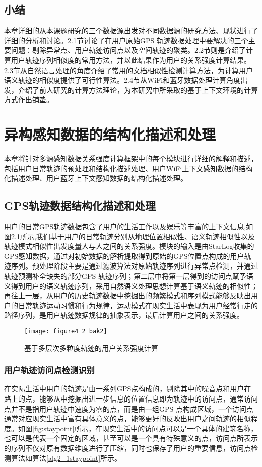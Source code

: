 \section{小结}
\label{sec:section2-4}
本章详细的从本课题研究的三个数据源出发对不同数据源的研究方法、现状进行了详细的分析和讨论。2.1节讨论了在用户原始GPS 轨迹数据处理中要解决的三个主要问题：剔除异常点、用户轨迹访问点以及空间轨迹的聚类。2.2节则是介绍了计算用户轨迹序列相似度的常用方法，并以此结果作为用户的关系强度计算结果。2.3节从自然语言处理的角度介绍了常用的文档相似性检测计算方法，为计算用户语义轨迹的相似度提供了可行性算法。2.4节从WiFi和蓝牙数据处理计算角度出发，介绍了前人研究的计算方法理论，为本研究中所采取的基于上下文环境的计算方式作出铺垫。


\chapter{异构感知数据的结构化描述和处理}
\label{chap:chapter03}
本章将针对多源感知数据关系强度计算框架中的每个模块进行详细的解释和描述，包括用户日常轨迹的预处理和结构化描述处理、用户WiFi上下文感知数据的结构化描述处理、用户蓝牙上下文感知数据的结构化描述处理。
\section{GPS轨迹数据结构化描述和处理}
\label{sec:section3-1}
用户的日常GPS轨迹数据包含了用户的生活工作以及娱乐等丰富的上下文信息,如图\ref{fig:tramodel}所示,我们基于用户的日常轨迹分别从地理位置相似性、语义轨迹相似性以及轨迹模式相似性出发度量人与人之间的关系强度。模块的输入是由StarLog收集的GPS感知数据，通过对初始数据的解析提取得到原始的GPS位置点构成的用户轨迹序列。预处理阶段主要是通过滤波算法对原始轨迹序列进行异常点检测，并通过轨迹预测补全缺失的部分GPS 轨迹序列；第二层中将第一层得到的访问点赋予语义得到用户的语义轨迹序列，采用自然语义处理思想计算基于语义轨迹的相似性；再往上一层，从用户的历史轨迹数据中挖掘出的频繁模式和序列模式能够反映出用户的日常轨迹运动习惯和行为规律，运动模式在现实生活中表现为用户经常行走的路径序列，是用户轨迹数据规律的抽象表示，最后计算用户之间的关系强度。
\begin{figure}[htp]
\centering
\texttt{[image: figure4\_2\_bak2]}
\caption{基于多层次多粒度轨迹的用户关系强度计算}
\label{fig:tramodel}
\end{figure}
\subsection{用户轨迹访问点检测识别}
在实际生活中用户的轨迹是由一系列GPS点构成的，剔除其中的噪音点和用户在路上的点，能够从中挖掘出进一步信息的位置信息即为轨迹中的访问点，通常访问点并不是指用户轨迹中速度为零的点，而是由一组GPS 点构成区域，一个访问点通常对应现实生活中富有具体意义的点，能够更好的反映出用户之间轨迹的相似程度。如图\ref{fig:staypoint}所示，在现实生活中的访问点可以是一个具体的建筑名称，也可以是代表一个固定的区域，甚至可以是一个具有特殊意义的点，访问点所表示的序列不仅对原有数据维度进行了压缩，同时也保存了用户的重要信息，访问点检测算法如算法\ref{alg2_1staypoint}所示。

